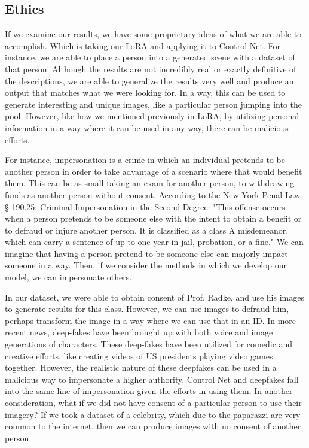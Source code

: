 \documentclass{article}
\begin{document}
\newpage
\subsection{Ethics}
If we examine our results, we have some proprietary ideas of what we are able to accomplish. Which is taking our LoRA and applying it to Control Net. For instance, we are able to place a person into a generated scene with a dataset of that person. Although the results are not incredibly real or exactly definitive of the descriptions, we are able to generalize the results very well and produce an output that matches what we were looking for. In a way, this can be used to generate interesting and unique images, like a particular person jumping into the pool. However, like how we mentioned previously in LoRA, by utilizing personal information in a way where it can be used in any way, there can be malicious efforts.

For instance, impersonation is a crime in which an individual pretends to be another person in order to take advantage of a scenario where that would benefit them. This can be as small taking an exam for another person, to withdrawing funds as another person without consent. According to the New York Penal Law § 190.25: Criminal Impersonation in the Second Degree: "This offense occurs when a person pretends to be someone else with the intent to obtain a benefit or to defraud or injure another person. It is classified as a class A misdemeanor, which can carry a sentence of up to one year in jail, probation, or a fine." We can imagine that having a person pretend to be someone else can majorly impact someone in a way. Then, if we consider the methods in which we develop our model, we can impersonate others. 

In our dataset, we were able to obtain consent of Prof. Radke, and use his images to generate results for this class. However, we can use images to defraud him, perhaps transform the image in a way where we can use that in an ID. In more recent news, deep-fakes have been brought up with both voice and image generations of characters. These deep-fakes have been utilized for comedic and creative efforts, like creating videos of US presidents playing video games together. However, the realistic nature of these deepfakes can be used in a malicious way to impersonate a higher authority. Control Net and deepfakes fall into the same line of impersonation given the efforts in using them. In another consideration, what if we did not have consent of a particular person to use their imagery? If we took a dataset of a celebrity, which due to the paparazzi are very common to the internet, then we can produce images with no consent of another person.
\end{document}
